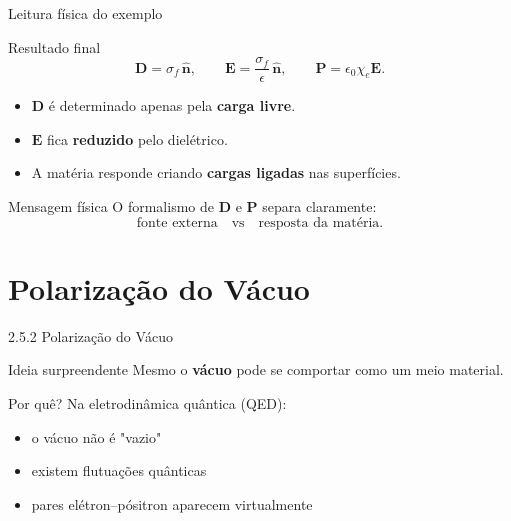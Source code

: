\documentclass[aspectratio=169]{beamer}
\begin{document}
\begin{frame}{Leitura física do exemplo}

\begin{block}{Resultado final}
\begin{equation}
\mathbf{D}=\sigma_f\,\hat{\mathbf{n}},
\qquad
\mathbf{E}=\frac{\sigma_f}{\epsilon}\,\hat{\mathbf{n}},
\qquad
\mathbf{P}=\epsilon_0\chi_e\mathbf{E}.
\end{equation}
\end{block}

\pause

\begin{itemize}
\item \(\mathbf{D}\) é determinado apenas pela \textbf{carga livre}.
\item \(\mathbf{E}\) fica \textbf{reduzido} pelo dielétrico.
\item A matéria responde criando \textbf{cargas ligadas} nas superfícies.
\end{itemize}

\pause

\begin{alertblock}{Mensagem física}
O formalismo de \(\mathbf{D}\) e \(\mathbf{P}\) separa claramente:
\[
\text{fonte externa} \quad \text{vs} \quad \text{resposta da matéria}.
\]
\end{alertblock}

\end{frame}


\section{Polarização do Vácuo}

\begin{frame}{2.5.2 Polarização do Vácuo}

\begin{block}{Ideia surpreendente}
Mesmo o \textbf{vácuo} pode se comportar como um meio material.
\end{block}

\pause

\begin{alertblock}{Por quê?}
Na eletrodinâmica quântica (QED):
\begin{itemize}
\item o vácuo não é "vazio"
\item existem flutuações quânticas
\item pares elétron–pósitron aparecem virtualmente
\end{itemize}
\end{alertblock}

\end{frame}
\end{document}
